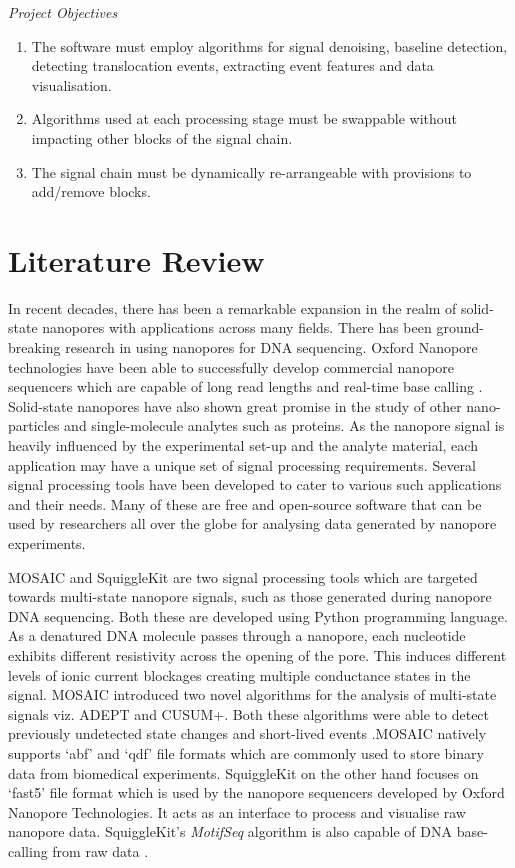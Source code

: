 \documentclass[journal]{IEEEtran}
\begin{document}
\noindent \textit{Project Objectives}
\begin{enumerate}
\item {The software must employ algorithms for signal denoising, baseline detection, detecting translocation events, extracting event features and data visualisation.}
\item {Algorithms used at each processing stage must be swappable without impacting other blocks of the signal chain.}
\item {The signal chain must be dynamically re-arrangeable with provisions to add/remove blocks.}
\end{enumerate}

\section{Literature Review}
In recent decades, there has been a remarkable expansion in the realm of solid-state nanopores with applications across many fields. There has been ground-breaking research in using nanopores for DNA sequencing. Oxford Nanopore technologies have been able to successfully develop commercial nanopore sequencers which are capable of long read lengths and real-time base calling \cite{ipMinIONAnalysisReference2015}. Solid-state nanopores have also shown great promise in the study of other nano-particles and single-molecule analytes such as proteins. As the nanopore signal is heavily influenced by the experimental set-up and the analyte material, each application may have a unique set of signal processing requirements. Several signal processing tools have been developed to cater to various such applications and their needs. Many of these are free and open-source software that can be used by researchers all over the globe for analysing data generated by nanopore experiments.

MOSAIC \cite{forstaterMOSAICModularSingleMolecule2016} and SquiggleKit \cite{fergusonSquiggleKitToolkitManipulating2019} are two signal processing tools which are targeted towards multi-state nanopore signals, such as those generated during nanopore DNA sequencing. Both these are developed using Python programming language. As a denatured DNA molecule passes through a nanopore, each nucleotide exhibits different resistivity across the opening of the pore. This induces different levels of ionic current blockages creating multiple conductance states in the signal. MOSAIC introduced two novel algorithms for the analysis of multi-state signals viz. ADEPT and CUSUM+. Both these algorithms were able to detect previously undetected state changes and short-lived events \cite{forstaterMOSAICModularSingleMolecule2016}.MOSAIC natively supports ‘abf’ and ‘qdf’ file formats which are commonly used to store binary data from biomedical experiments. SquiggleKit on the other hand focuses on ‘fast5’ file format which is used by the nanopore sequencers developed by Oxford Nanopore Technologies. It acts as an interface to process and visualise raw nanopore data. SquiggleKit’s \textit{MotifSeq} algorithm is also capable of DNA base-calling from raw data \cite{fergusonSquiggleKitToolkitManipulating2019}.
\end{document}
